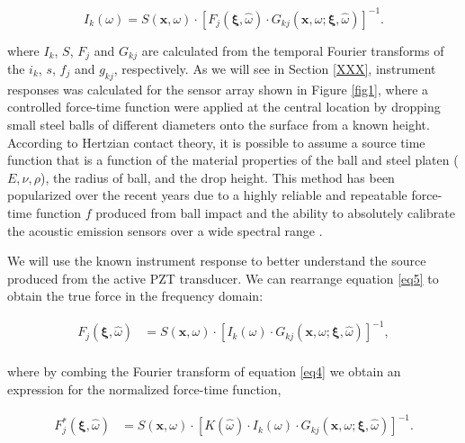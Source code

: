 \documentclass[preprint,3p, 11pt,authoryear]{elsarticle}
\begin{document}
\begin{equation}
    \label{eq5}
        I_{k}\left(\omega \right) = 
        S\left( \mathbf{x}, \omega \right) \cdot \left[ F_{j}\left( \mathbf{\xi}, \hat{\omega} \right) \cdot G_{kj}\left( \mathbf{x}, \omega; \mathbf{\xi}, \hat{\omega} \right)\right]^{-1} .
\end{equation}

\noindent where $I_{k}$, $S$, $F_{j}$ and $G_{kj}$ are calculated from the temporal Fourier transforms of the $i_{k}$, $s$, $f_{j}$ and $g_{kj}$, respectively.  As we will see in Section \ref{XXX}, instrument responses was calculated for the sensor array shown in Figure \ref{fig1}, where a controlled force-time function were applied at the central location by dropping small steel balls of different diameters onto the surface from a known height. According to Hertzian contact theory, it is possible to assume a source time function that is a function of the material properties of the ball and steel platen ($E, \nu, \rho$), the radius of ball, and the drop height. This method has been popularized over the recent years due to a highly reliable and repeatable force-time function $f$ produced from ball impact and the ability to absolutely calibrate the acoustic emission sensors over a wide spectral range \citep{McLaskey2010, McLaskey2012, McLaskey2015}.

We will use the known instrument response to better understand the source produced from the active PZT transducer.  We can rearrange equation \eqref{eq5} to obtain the true force in the frequency domain:

\begin{equation}
    \label{eq6}
\begin{split}
F_{j}\left( \mathbf{\xi}, \hat{\omega} \right) & = 
        S\left( \mathbf{x}, \omega \right) \cdot \left[ I_{k}\left(\omega \right) \cdot G_{kj}\left( \mathbf{x}, \omega; \mathbf{\xi}, \hat{\omega} \right)\right]^{-1}, \\
\end{split}
\end{equation}

\noindent where by combing the Fourier transform of equation \eqref{eq4} we obtain an expression for the normalized force-time function,

\begin{equation}
    \label{eq7}
\begin{split}
F^{*}_{j}\left( \mathbf{\xi}, \hat{\omega} \right) & = 
        S\left( \mathbf{x}, \omega \right) \cdot \left[ K\left(\hat{\omega}\right) \cdot I_{k}\left(\omega \right) \cdot G_{kj}\left( \mathbf{x}, \omega; \mathbf{\xi}, \hat{\omega} \right)\right]^{-1}.\\     
\end{split}
\end{equation}
\end{document}
